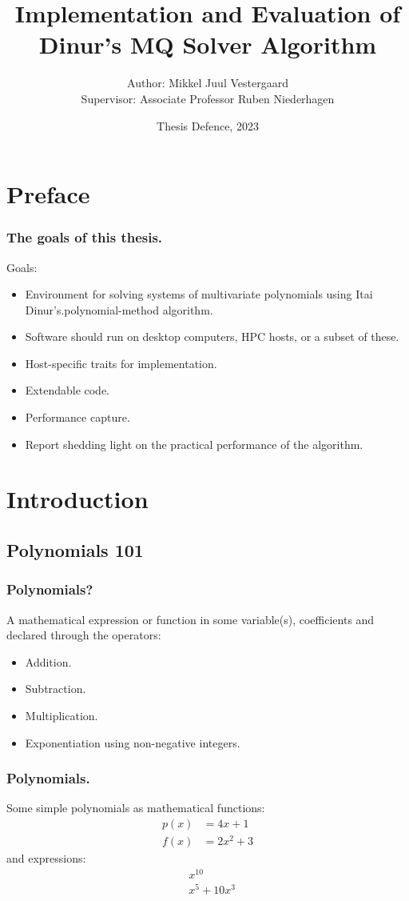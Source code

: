 \documentclass{beamer}
\title{Implementation and Evaluation of Dinur's MQ Solver Algorithm}
\author{Author: Mikkel Juul Vestergaard\\Supervisor: Associate Professor Ruben Niederhagen}
\institute{Department of Mathematics and Computer Science\\University of Southern Denmark}
\date{Thesis Defence, 2023}
\begin{document}
\frame{\titlepage}

\section{Preface}
\begin{frame}
    \frametitle{The goals of this thesis.}
    Goals:
    \begin{itemize}
        \item Environment for solving systems of multivariate polynomials using Itai Dinur's.polynomial-method algorithm.
        \item Software should run on desktop computers, HPC hosts, or a subset of these.
        \item Host-specific traits for implementation.
        \item Extendable code.
        \item Performance capture.
        \item Report shedding light on the practical performance of the algorithm.
    \end{itemize}
\end{frame}

\section{Introduction}
\subsection{Polynomials 101}
\begin{frame}
    \frametitle{Polynomials?}
    A mathematical expression or function in some variable(s), coefficients and declared through the operators:
    \begin{itemize}
        \item Addition.
        \item Subtraction.
        \item Multiplication.
        \item Exponentiation using non-negative integers.
    \end{itemize}
\end{frame}

\begin{frame}
    \frametitle{Polynomials.}
    Some simple polynomials as mathematical functions:
    \begin{equation*}
        \begin{split}
            p(x) &= 4x + 1\\
            f(x) &= 2x^2 + 3
        \end{split}
    \end{equation*}
    and expressions:
    \begin{equation*}
        \begin{split}
            &x^{10}\\
            &x^5 + 10x^3
        \end{split}
    \end{equation*}

\end{frame}
\end{document}
